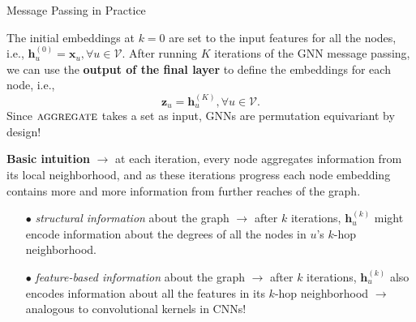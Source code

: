 \documentclass[10pt, aspectratio=169, compress, protectframetitle, handout]{beamer}
\begin{document}
\begin{frame}{Message Passing in Practice}

    The initial embeddings at $k = 0$ are set to the input features for all the nodes, i.e., $\mathbf h^{(0)}_u = \mathbf x_u, \forall u \in \mathcal V$. After running $K$ iterations of the GNN message passing, we can use the \textbf{output of the final layer} to define the \alert{embeddings} for each node, i.e.,
    \begin{equation}
        \mathbf z_u = \mathbf h^{(K)}_u, \forall u \in \mathcal V.
    \end{equation}
    Since $\textsc{aggregate}$ takes a set as input, GNNs are \alert{permutation equivariant} by design!
    
    \textbf{Basic intuition} $\longrightarrow$ at each iteration, every node aggregates information from its local neighborhood, and as these iterations progress each node embedding contains more and more information from further reaches of the graph.
    
    \begin{itemize}
        \item[\alert{$\bullet$}] \emph{structural information} about the graph $\longrightarrow$ after $k$ iterations, $\mathbf h^{(k)}_u$ might encode information about the \alert{degrees} of all the nodes in $u$'s $k$-hop neighborhood.
    
        \item[\alert{$\bullet$}] \emph{feature-based information} about the graph $\longrightarrow$ after $k$ iterations, $\mathbf h^{(k)}_u$ also encodes information about all the \alert{features} in its $k$-hop neighborhood $\rightarrow$ analogous to convolutional kernels in CNNs!
    \end{itemize}
    
\end{frame}
\end{document}
